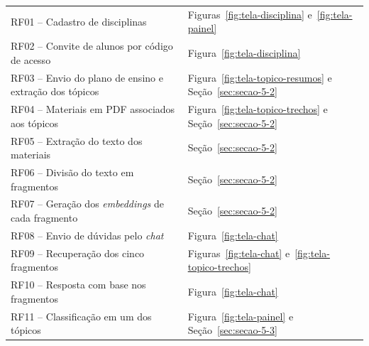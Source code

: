 \begin{quadro}[H]\captionsetup{name=Quadro}
\centering
\caption{Atendimento aos Requisitos}
\label{quad:atendimento-requisitos}

\renewcommand{\arraystretch}{1.3}
\setlength{\tabcolsep}{4pt}

\begin{tabularx}{\textwidth}{
|>{\raggedright\arraybackslash}X
|>{\raggedright\arraybackslash}X|
}
\hline

\rowcolor[HTML]{C0C0C0}
\multicolumn{1}{|c|}{\textbf{Requisito}} &
\multicolumn{1}{c|}{\textbf{Evidência}} \\ \hline

RF01 -- Cadastro de disciplinas &
Figuras~\ref{fig:tela-disciplina} e~\ref{fig:tela-painel} \\ \hline

RF02 -- Convite de alunos por código de acesso &
Figura~\ref{fig:tela-disciplina} \\ \hline

RF03 -- Envio do plano de ensino e extração dos tópicos &
Figura~\ref{fig:tela-topico-resumos} e Seção~\ref{sec:secao-5-2} \\ \hline

RF04 -- Materiais em PDF associados aos tópicos &
Figura~\ref{fig:tela-topico-trechos} e Seção~\ref{sec:secao-5-2} \\ \hline

RF05 -- Extração do texto dos materiais &
Seção~\ref{sec:secao-5-2} \\ \hline

RF06 -- Divisão do texto em fragmentos &
Seção~\ref{sec:secao-5-2} \\ \hline

RF07 -- Geração dos \textit{embeddings} de cada fragmento &
Seção~\ref{sec:secao-5-2} \\ \hline

RF08 -- Envio de dúvidas pelo \textit{chat} &
Figura~\ref{fig:tela-chat} \\ \hline

RF09 -- Recuperação dos cinco fragmentos &
Figuras~\ref{fig:tela-chat} e~\ref{fig:tela-topico-trechos} \\ \hline

RF10 -- Resposta com base nos fragmentos &
Figura~\ref{fig:tela-chat} \\ \hline

RF11 -- Classificação em um dos tópicos &
Figura~\ref{fig:tela-painel} e Seção~\ref{sec:secao-5-3} \\ \hline


\end{tabularx}
\end{quadro}
